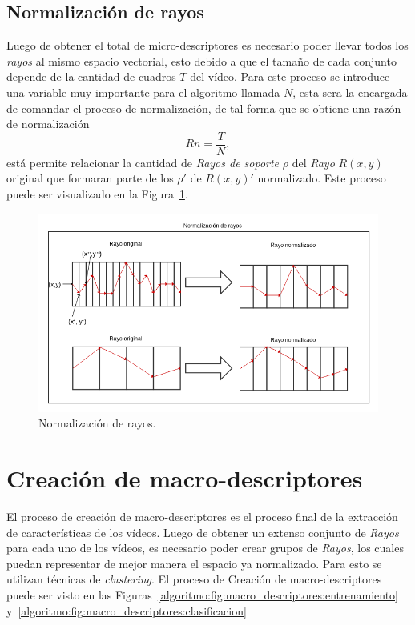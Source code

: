 	
		
		
	\subsection{Normalización de rayos}
	\label{algoritmo:normalizacion}
	Luego de obtener el total de micro-descriptores es necesario poder llevar todos los \textit{rayos} al mismo espacio vectorial, esto debido a que el tamaño de cada conjunto depende de la cantidad de cuadros $T$ del vídeo. Para este proceso se introduce una variable muy importante para el algoritmo llamada $N$, esta sera la encargada de comandar el proceso de normalización, de tal forma que se obtiene una razón de normalización
	\begin{equation}
		Rn = \frac{T}{N},
	\end{equation}
	está permite relacionar la cantidad de \textit{Rayos de soporte} $\rho$ del \textit{Rayo} $R(x,y)$ original que formaran parte de los $\rho'$ de $R(x,y)'$ normalizado. Este proceso puede ser visualizado en la Figura~\ref{algoritmo:fig:normalizacion}.
	
	\begin{figure}[bt]
		\centering
    		\includegraphics[width=1\textwidth]{Figuras/Diagramas/normalizacion_de_rayos.png}
  		\caption{Normalización de rayos.}
  		\label{algoritmo:fig:normalizacion}
	\end{figure}	

	
\newpage	
\section{Creación de macro-descriptores}
\label{sec:macro-descriptores}
El proceso de creación de macro-descriptores es el proceso final de la extracción de características de los vídeos. Luego de obtener un extenso conjunto de \textit{Rayos} para cada uno de los vídeos, es necesario poder crear grupos de \textit{Rayos}, los cuales puedan representar de mejor manera el espacio ya normalizado. Para esto se utilizan técnicas de \textit{clustering}. El proceso de Creación de macro-descriptores puede ser visto en las Figuras~\ref{algoritmo:fig:macro_descriptores:entrenamiento} y~\ref{algoritmo:fig:macro_descriptores:clasificacion}

